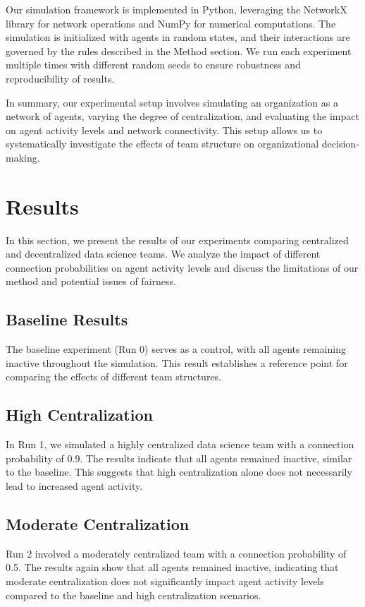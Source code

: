 \documentclass{article} %
\begin{document}
Our simulation framework is implemented in Python, leveraging the NetworkX library for network operations and NumPy for numerical computations. The simulation is initialized with agents in random states, and their interactions are governed by the rules described in the Method section. We run each experiment multiple times with different random seeds to ensure robustness and reproducibility of results.

In summary, our experimental setup involves simulating an organization as a network of agents, varying the degree of centralization, and evaluating the impact on agent activity levels and network connectivity. This setup allows us to systematically investigate the effects of team structure on organizational decision-making.

\section{Results}
\label{sec:results}

In this section, we present the results of our experiments comparing centralized and decentralized data science teams. We analyze the impact of different connection probabilities on agent activity levels and discuss the limitations of our method and potential issues of fairness.

\subsection{Baseline Results}
The baseline experiment (Run 0) serves as a control, with all agents remaining inactive throughout the simulation. This result establishes a reference point for comparing the effects of different team structures.

\subsection{High Centralization}
In Run 1, we simulated a highly centralized data science team with a connection probability of 0.9. The results indicate that all agents remained inactive, similar to the baseline. This suggests that high centralization alone does not necessarily lead to increased agent activity.

\subsection{Moderate Centralization}
Run 2 involved a moderately centralized team with a connection probability of 0.5. The results again show that all agents remained inactive, indicating that moderate centralization does not significantly impact agent activity levels compared to the baseline and high centralization scenarios.
\end{document}
